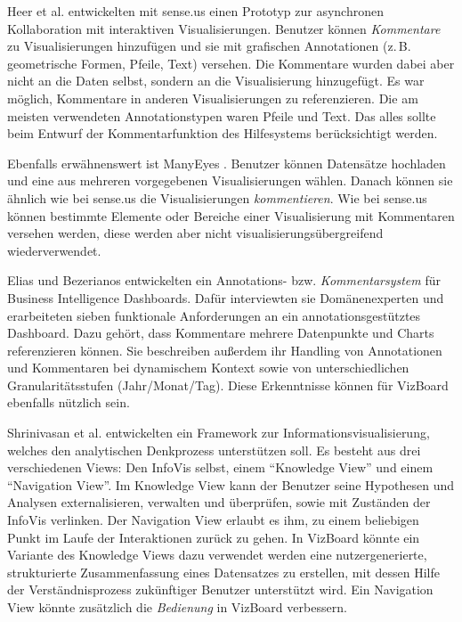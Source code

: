 \documentclass[
	headsepline,
	footsepline,
	fontsize=12pt,
	bibliography=totoc
]{scrbook}
\begin{document}

Heer et al. \cite{Heer2007} entwickelten mit sense.us einen Prototyp zur asynchronen Kollaboration mit interaktiven Visualisierungen. Benutzer können \emph{Kommentare} zu Visualisierungen hinzufügen und sie mit grafischen Annotationen (z.\,B. geometrische Formen, Pfeile, Text) versehen. Die Kommentare wurden dabei aber nicht an die Daten selbst, sondern an die Visualisierung hinzugefügt. Es war möglich, Kommentare in anderen Visualisierungen zu referenzieren. Die am meisten verwendeten Annotationstypen waren Pfeile und Text. Das alles sollte beim Entwurf der Kommentarfunktion des Hilfesystems berücksichtigt werden.


Ebenfalls erwähnenswert ist ManyEyes \cite{Viegas2007}. Benutzer können Datensätze hochladen und eine aus mehreren vorgegebenen Visualisierungen wählen. Danach können sie ähnlich wie bei sense.us die Visualisierungen \emph{kommentieren}. Wie bei sense.us können bestimmte Elemente oder Bereiche einer Visualisierung mit Kommentaren versehen werden, diese werden aber nicht visualisierungsübergreifend wiederverwendet.


Elias und Bezerianos \cite{Elias2012} entwickelten ein Annotations- bzw. \emph{Kommentarsystem} für Business Intelligence Dashboards.
Dafür interviewten sie Domänenexperten und erarbeiteten sieben funktionale Anforderungen an ein annotationsgestütztes Dashboard. Dazu gehört, dass Kommentare mehrere Datenpunkte und Charts referenzieren können. Sie beschreiben außerdem ihr Handling von Annotationen und Kommentaren bei dynamischem Kontext sowie von unterschiedlichen Granularitätsstufen (Jahr/Monat/Tag). 
Diese Erkenntnisse können für VizBoard ebenfalls nützlich sein.


Shrinivasan et al. \cite{Shrinivasan2008} entwickelten ein Framework zur Informationsvisualisierung, welches den analytischen Denkprozess unterstützen soll.
Es besteht aus drei verschiedenen Views: Den InfoVis selbst, einem \enquote{Knowledge View} und einem \enquote{Navigation View}. Im Knowledge View kann der Benutzer seine Hypothesen und Analysen externalisieren, verwalten und überprüfen, sowie mit Zuständen der InfoVis verlinken. Der Navigation View erlaubt es ihm, zu einem beliebigen Punkt im Laufe der Interaktionen zurück zu gehen.
In VizBoard könnte ein Variante des Knowledge Views dazu verwendet werden eine nutzergenerierte, strukturierte Zusammenfassung eines Datensatzes zu erstellen, mit dessen Hilfe der Verständnisprozess zukünftiger Benutzer unterstützt wird. Ein Navigation View könnte zusätzlich die \emph{Bedienung} in VizBoard verbessern.
\end{document}
